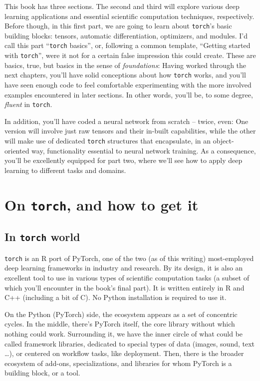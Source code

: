 \documentclass[
  letterpaper,
]{krantz}
\begin{document}
This book has three sections. The second and third will explore various
deep learning applications and essential scientific computation
techniques, respectively. Before though, in this first part, we are
going to learn about \texttt{torch}'s basic building blocks: tensors,
automatic differentiation, optimizers, and modules. I'd call this part
``\texttt{torch} basics'', or, following a common template, ``Getting
started with \texttt{torch}'', were it not for a certain false
impression this could create. These are basics, true, but basics in the
sense of \emph{foundations}: Having worked through the next chapters,
you'll have solid conceptions about how \texttt{torch} works, and you'll
have seen enough code to feel comfortable experimenting with the more
involved examples encountered in later sections. In other words, you'll
be, to some degree, \emph{fluent} in \texttt{torch}.

In addition, you'll have coded a neural network from scratch -- twice,
even: One version will involve just raw tensors and their in-built
capabilities, while the other will make use of dedicated \texttt{torch}
structures that encapsulate, in an object-oriented way, functionality
essential to neural network training. As a consequence, you'll be
excellently equipped for part two, where we'll see how to apply deep
learning to different tasks and domains.

\hypertarget{sec:basics-torch}{%
\chapter{\texorpdfstring{On \texttt{torch}, and how to get
it}{On torch, and how to get it}}\label{sec:basics-torch}}

\hypertarget{in-torch-world}{%
\section{\texorpdfstring{In \texttt{torch}
world}{In torch world}}\label{in-torch-world}}

\texttt{torch} is an R port of PyTorch, one of the two (as of this
writing) most-employed deep learning frameworks in industry and
research. By its design, it is also an excellent tool to use in various
types of scientific computation tasks (a subset of which you'll
encounter in the book's final part). It is written entirely in R and C++
(including a bit of C). No Python installation is required to use it.

On the Python (PyTorch) side, the ecosystem appears as a set of
concentric cycles. In the middle, there's PyTorch itself,
the core library without which nothing could work. Surrounding it, we
have the inner circle of what could be called framework libraries,
dedicated to special types of data (images, sound, text \ldots), or
centered on workflow tasks, like deployment. Then, there is the broader
ecosystem of add-ons, specializations, and libraries for whom PyTorch is
a building block, or a tool.
\end{document}
